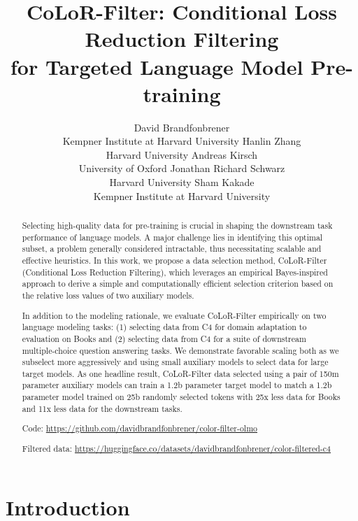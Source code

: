 \documentclass{article}
\title{
{\color{Red}C}{\color{Orange}o}{\color{Goldenrod}L}{\color{Green}o}{\color{NavyBlue}R}{\color{NavyBlue}-}{\color{Purple}Filter}:
Conditional Loss Reduction Filtering \\for Targeted Language Model Pre-training
}
\author{
David Brandfonbrener\\
Kempner Institute at Harvard University
\And
Hanlin Zhang\\
Harvard University
\And
Andreas Kirsch\\
University of Oxford
\And 
Jonathan Richard Schwarz\\
Harvard University
\And
Sham Kakade\\
Kempner Institute at Harvard University
}
\begin{document}
\maketitle

\begin{abstract}
Selecting high-quality data for pre-training is crucial in shaping the downstream task performance of language models. A major challenge lies in identifying this optimal subset, a problem generally considered intractable, thus necessitating scalable and effective heuristics. In this work, we propose a data selection method, CoLoR-Filter (Conditional Loss Reduction Filtering), which leverages an empirical Bayes-inspired approach to derive a simple and computationally efficient selection criterion based on the relative loss values of two auxiliary models.

In addition to the modeling rationale, we evaluate CoLoR-Filter empirically on two language modeling tasks: (1) selecting data from C4 for domain adaptation to evaluation on Books and (2) selecting data from C4 for a suite of downstream multiple-choice question answering tasks. We demonstrate favorable scaling both as we subselect more aggressively and using small auxiliary models to select data for large target models. As one headline result, CoLoR-Filter data selected using a pair of 150m parameter auxiliary models can train a 1.2b parameter target model to match a 1.2b parameter model trained on 25b randomly selected tokens with 25x less data for Books and 11x less data for the downstream tasks. 

Code: {\tiny \url{https://github.com/davidbrandfonbrener/color-filter-olmo}}

Filtered data: {\tiny \url{https://huggingface.co/datasets/davidbrandfonbrener/color-filtered-c4} }
\end{abstract}



\section{Introduction}
\end{document}
